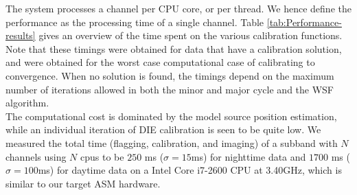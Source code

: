 \documentclass[referee]{aa}
\begin{document}
The system processes a channel per CPU core, or per thread. We hence define the
performance   as   the   processing   time   of   a   single   channel.    Table
\ref{tab:Performance-results} gives an overview of the time spent on the various
calibration functions. Note that these  timings were obtained for data that have
a calibration solution, and were  obtained for the worst case computational case
of calibrating to convergence. When no  solution is found, the timings depend on
the maximum number  of iterations allowed in both the minor  and major cycle and
the WSF  algorithm. \\ The computational  cost is dominated by  the model source
position estimation, while an individual iteration of DIE calibration is seen to
be quite low.  We measured the  total time (flagging, calibration, and imaging) of a
subband with $N$  channels using $N$ cpus  to be $250$ ms ($\sigma  = 15$ms) for
nighttime data and  $1700$ ms ($\sigma = 100$ms) for daytime  data on a Intel
Core i7-2600 CPU at 3.40GHz, which is similar to our target ASM hardware.
\begin{table}[tbh]
\caption{Functional profile of real-time calibration and imaging code.}
\label{tab:Performance-results}

\end{table}
\end{document}
